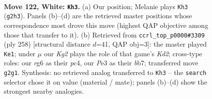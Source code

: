 \documentclass[11pt]{article}
\begin{document}
\begin{figure}[p]\centering
\begin{subfigure}{0.46\textwidth}\centering
\resizebox{\linewidth}{!}{%
\newchessgame
\chessboard[
  setfen={6k1/8/p5r1/P1p2p1p/1p3P1P/1P2P1P1/6K1/7R w - - 31 122},
  showmover=false,
  pgfstyle=straightmove, color=movearrow, markmove={g2-h3}
]}
\caption{}
\end{subfigure}\hfill
\begin{subfigure}{0.46\textwidth}\centering
\resizebox{\linewidth}{!}{%
\newchessgame
\chessboard[
  setfen={8/1b1k3N/8/1p3p2/p1pP1Pp1/P1P3P1/1P1K4/8 w - - 41 130},
  showmover=false,
  pgfstyle=straightmove, color=movearrow, markmove={d2-e1}
]}
\caption{}
\end{subfigure}
\\[4pt]

\caption{\textbf{Move 122, White: \texttt{Kh3}.} (a) Our position; Melanie plays \texttt{Kh3} (\texttt{g2h3}). Panels (b)--(d) are the retrieved master positions whose correspondence most drove this move (highest QAP objective among those that transfer to it). (b) Retrieved from \texttt{ccrl\_top\_p0000\#3309} (ply 258) [structural distance $d$=41, QAP obj=3]: the master played \texttt{Ke1}; under $\mu$ our \emph{Kg2} plays the role of that game's \emph{Kd2}; cross-type roles: our \emph{r}g6 as their \emph{p}c4, our \emph{P}e3 as their \emph{b}b7; transferred move \texttt{g2g1}. Synthesis: no retrieved analog transferred to \texttt{Kh3} -- the \texttt{search} selector chose it on value (material / mate); panels (b)--(d) show the strongest nearby analogies.}
\label{fig:thought-m242}
\end{figure}

\clearpage
\end{document}
